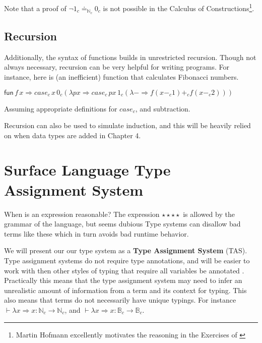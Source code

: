 

Note that a proof of $\lnot1_{c}\doteq_{\mathbb{N}_{c}}0_{c}$ is
not possible in the Calculus of Constructions\cite{10.2307/2274575}\footnote{Martin Hofmann excellently motivates the reasoning in the Exercises
of \cite{hofmann_1997}}. 


\subsection{Recursion}

Additionally, the syntax of functions builds in unrestricted recursion.
Though not always necessary, recursion can be very helpful for writing
programs. For instance, here is (an inefficient) function that calculates
Fibonacci numbers.

$\mathsf{fun}\,f\,x\Rightarrow case_{c}\,x\,0_{c}\left(\lambda px\Rightarrow case_{c}\,px\,1_{c}\left(\lambda-\Rightarrow f\left(x-_{c}1\right)+_{c}f\left(x-_{c}2\right)\right)\right)$

Assuming appropriate definitions for $case_{c}$, and subtraction.

Recursion can also be used to simulate induction, and this will be
heavily relied on when data types are added in Chapter 4.


\section{Surface Language Type Assignment System}

When is an expression reasonable? The expression $\star\star\star\star$
is allowed by the grammar of the language, but seems dubious%
Type systems can disallow bad terms like these which in turn avoids
bad runtime behavior.

We will present our our type system as a \textbf{Type Assignment System}
(TAS). Type assignment systems do not require type annotations, and
will be easier to work with then other styles of typing that require
all variables be annotated  .
Practically this means that the type assignment system may need to
infer an unrealistic amount of information from a term and its context
for typing. This also means that terms do not necessarily have unique
typings. For instance $\vdash\lambda x\Rightarrow x:\mathbb{N}_{c}\rightarrow\mathbb{N}_{c}$,
and $\vdash\lambda x\Rightarrow x:\mathbb{B}_{c}\rightarrow\mathbb{B}_{c}$. 

